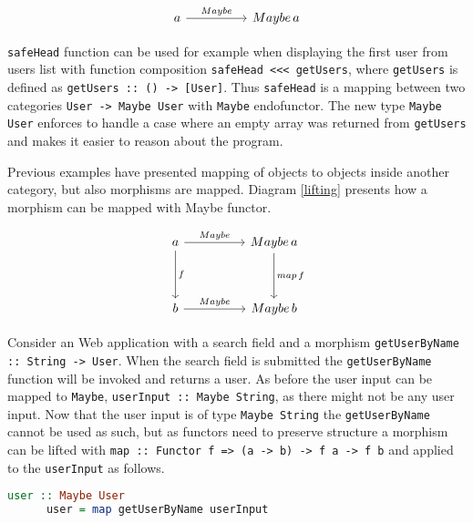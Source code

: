 \documentclass[article]{aaltoseries}
\begin{document}
    \begin{equation}
      \label{mapping}
      \begin{tikzcd}[row sep=huge, column sep=huge]
        a \arrow[r, "Maybe"]
        & Maybe\, a
      \end{tikzcd}
    \end{equation}

    \lstinline|safeHead| function can be used for example when displaying the
    first user from users list with function composition
    \lstinline|safeHead <<< getUsers|, where \lstinline|getUsers| is defined as
    \lstinline|getUsers :: () -> [User]|. Thus \lstinline|safeHead| is a mapping
    between two categories \lstinline|User -> Maybe User| with \lstinline|Maybe|
    endofunctor. The new type \lstinline|Maybe User| enforces to handle a case
    where an empty array was returned from \lstinline|getUsers| and makes it
    easier to reason about the program.

    Previous examples have presented mapping of objects to objects inside
    another category, but also morphisms are mapped. Diagram \ref{lifting}
    presents how a morphism can be mapped with Maybe functor.

    \begin{equation}
      \label{lifting}
      \begin{tikzcd}[row sep=huge, column sep=huge]
        a \arrow[r, "Maybe"]
        \arrow[d, "f"]
        & Maybe\, a
        \arrow[d, "map\, f"]
        \\
        b \arrow[r, "Maybe"]
        & Maybe\, b
      \end{tikzcd}
    \end{equation}

    Consider an Web application with a search field and a morphism
    \lstinline|getUserByName :: String -> User|. When the search field is
    submitted the \lstinline|getUserByName| function will be invoked and returns
    a user. As before the user input can be mapped to \lstinline|Maybe|,
    \lstinline|userInput :: Maybe String|, as there might not be any user input.
    Now that the user input is of type \lstinline|Maybe String| the
    \lstinline|getUserByName| cannot be used as such, but as functors need to
    preserve structure a morphism can be lifted with
    \lstinline|map :: Functor f => (a -> b) -> f a -> f b| and applied to the
    \lstinline|userInput| as follows. 

    \begin{lstlisting}[language=Haskell]
      user :: Maybe User
      user = map getUserByName userInput
    \end{lstlisting}
\end{document}
